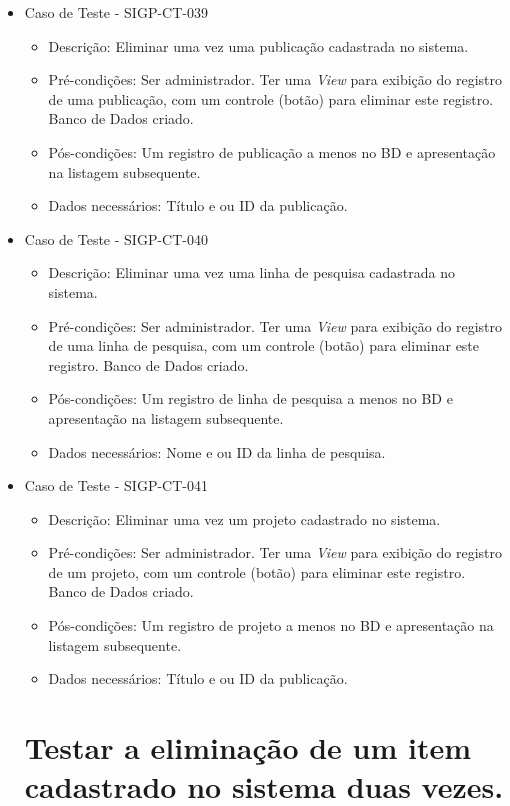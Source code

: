 \documentclass[11pt, a4paper]{book}
\begin{document}
\begin{itemize}
\newpage

	\item Caso de Teste - SIGP-CT-039
	\begin{itemize}
	\item Descrição: Eliminar uma vez uma publicação cadastrada no sistema.
	\item Pré-condições: Ser administrador. Ter uma \emph{View} para exibição do registro de uma publicação, com um controle (botão) para eliminar este registro. Banco de Dados criado.
	\item Pós-condições: Um registro de publicação a menos no BD e apresentação na listagem subsequente.
	\item Dados necessários: Título e ou ID da publicação.
	\end{itemize}


	\item Caso de Teste - SIGP-CT-040
	\begin{itemize}
	\item Descrição: Eliminar uma vez uma linha de pesquisa cadastrada no sistema.
	\item Pré-condições: Ser administrador. Ter uma \emph{View} para exibição do registro de uma linha de pesquisa, com um controle (botão) para eliminar este registro. Banco de Dados criado.
	\item Pós-condições: Um registro de linha de pesquisa a menos no BD e apresentação na listagem subsequente.
	\item Dados necessários: Nome e ou ID da linha de pesquisa.
	\end{itemize}

	\item Caso de Teste - SIGP-CT-041
	\begin{itemize}
	\item Descrição: Eliminar uma vez um projeto cadastrado no sistema.
	\item Pré-condições: Ser administrador. Ter uma \emph{View} para exibição do registro de um projeto, com um controle (botão) para eliminar este registro. Banco de Dados criado.
	\item Pós-condições: Um registro de projeto a menos no BD e apresentação na listagem subsequente.
	\item Dados necessários: Título e ou ID da publicação.
	\end{itemize}

\newpage
\section{Testar a eliminação de um item cadastrado no sistema duas vezes.}


\end{itemize}
\end{document}
